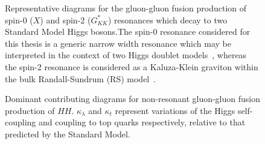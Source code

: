 \begin{figure}[ht]
\centering
{}

\caption{\label{fig:ggF-diagrams-res} Representative diagrams for the gluon-gluon fusion production of spin-0 ($X$) 
and spin-2 ($G_{KK}^{*}$) resonances which decay to two Standard Model Higgs bosons.The spin-0 resonance considered
for this thesis is a generic narrow width resonance which may be interpreted in the context of 
two Higgs doublet models~\cite{2HDM}, whereas the spin-2 resonance is considered as a Kaluza-Klein graviton within the bulk Randall-Sundrum (RS) model~\cite{Gravitons,Carvalho}.}
\end{figure}

\begin{figure}[ht]
\centering
{}

\caption{\label{fig:ggF-diagrams-nonres} Dominant contributing diagrams for non-resonant gluon-gluon fusion production of 
$HH$. $\kappa_{\lambda}$ and $\kappa_{t}$ represent variations of the Higgs self-coupling and coupling to top quarks 
respectively, relative to that predicted by the Standard Model.}
\end{figure}

